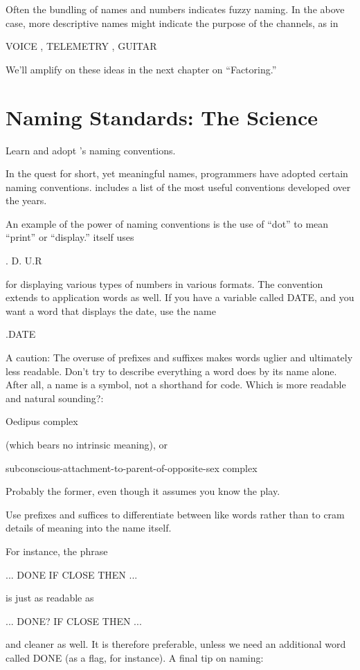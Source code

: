 Often the bundling of names and numbers indicates fuzzy naming.
In the above case, more descriptive names might indicate the purpose of
the channels, as in
\begin{Code}
VOICE , TELEMETRY , GUITAR
\end{Code}

We'll amplify on these ideas in the next chapter on ``Factoring.''

\section{Naming Standards: The Science}

\begin{tip}
Learn and adopt \Forth{}'s naming conventions.
\end{tip}
In the quest for short, yet meaningful names, \Forth{} programmers
have adopted certain naming conventions.   includes a list of
the most useful conventions developed over the years.

An example of the power of naming conventions is the use of ``dot''
to mean ``print'' or ``display.'' \Forth{} itself uses
\begin{Code}
.  D.  U.R
\end{Code}
for displaying various types of numbers in various formats.  The convention
extends to application words as well.  If you have a variable called
DATE, and you want a word that displays the date, use the name
\begin{Code}
.DATE
\end{Code}
A caution: The overuse of prefixes and suffixes makes words uglier and
ultimately less readable.  Don't try to describe everything a word does by
its name alone.  After all, a name is a symbol, not a shorthand for code.
Which is more readable and natural sounding?:
\begin{tfquot}
Oedipus complex
\end{tfquot}
(which bears no intrinsic meaning), or
\begin{tfquot}
subconscious-attachment-to-parent-of-opposite-sex complex
\end{tfquot}
Probably the former, even though it assumes you know the play.

\begin{tip}
Use prefixes and suffices to differentiate between like words rather than to
cram details of meaning into the name itself.
\end{tip}
For instance, the phrase
\begin{Code}
... DONE IF CLOSE THEN ...
\end{Code}
is just as readable as
\begin{Code}
... DONE? IF CLOSE THEN ...
\end{Code}
and cleaner as well.  It is therefore preferable, unless we need an additional
word called DONE (as a flag, for instance).
A final tip on naming:

